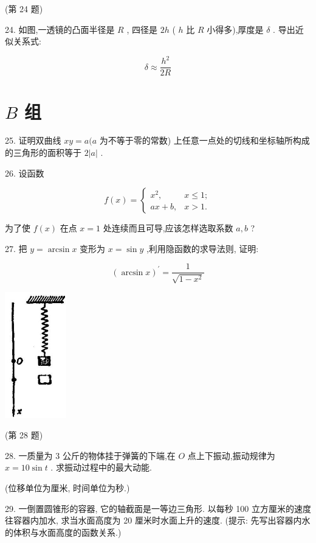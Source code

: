 \documentclass[10pt]{article}
\begin{document}
(第 24 题)

24. 如图,一透镜的凸面半径是 \(R\) , 四径是 \({2h}\) ( \(h\) 比 \(R\) 小得多),厚度是 \(\delta\) . 导出近似关系式:

\[
\delta \approx \frac{{h}^{2}}{2R}
\]

\section*{\(B\) 组}

25. 证明双曲线 \({xy} = a(a\) 为不等于零的常数) 上任意一点处的切线和坐标轴所构成的三角形的面积等于 \(2\left| a\right|\) .

26. 设函数

\[
f\left( x\right) = \left\{ \begin{array}{ll} {x}^{2}, & x \leq 1; \\ {ax} + b, & x > 1. \end{array}\right.
\]

为了使 \(f\left( x\right)\) 在点 \(x = 1\) 处连续而且可导,应该怎样选取系数 \(a,b\) ?

27. 把 \(y = \arcsin x\) 变形为 \(x = \sin y\) ,利用隐函数的求导法则, 证明:

\[
{\left( \arcsin x\right) }^{\prime } = \frac{1}{\sqrt{1 - {x}^{2}}}
\]

\begin{center}
\includegraphics[max width=0.2\textwidth]{images/01912c18-5c3f-733d-b775-749ba9897a9d_129_320008.jpg}
\end{center}

(第 28 题)

28. 一质量为 3 公斤的物体挂于弹簧的下端,在 \(O\) 点上下振动,振动规律为 \(x = {10}\sin t\) . 求振动过程中的最大动能.

(位移单位为厘米, 时间单位为秒.)

29. 一倒置圆锥形的容器, 它的轴截面是一等边三角形. 以每秒 100 立方厘米的速度往容器内加水, 求当水面高度为 20 厘米时水面上升的速度. (提示: 先写出容器内水的体积与水面高度的函数关系.)
\end{document}
